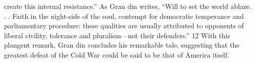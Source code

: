 create this internal resistance.” As Gran din writes, “Will to set the world ablaze. . . Faith in the night-side of the soul, contempt for democratic temperance and parliamentary procedure: these qualities are usually attributed to opponents of liberal civility, tolerance and pluralism—not their defenders.” {\color{blue} 12 } With this plangent remark, Gran din concludes his remarkable tale, suggesting that the greatest defeat of the Cold War could be said to be that of America itself.{\par}